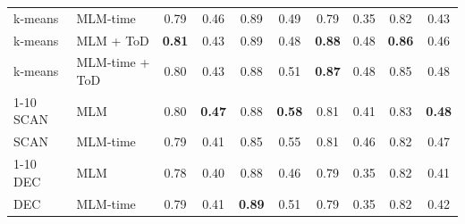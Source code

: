 \begin{table}[t]
\begin{tabular}{llcccccc|cc}
k-means & MLM-time & 0.79 & 0.46 & 0.89 & 0.49 & 0.79 & 0.35 & 0.82 & 0.43 \\
k-means & MLM + ToD & \textbf{0.81} & 0.43 & 0.89 & 0.48 & \textbf{0.88} & 0.48 & \textbf{0.86} & 0.46 \\
k-means & MLM-time + ToD & 0.80 & 0.43 & 0.88 & 0.51 & \textbf{0.87} & 0.48 & 0.85 & 0.48 \\
\cmidrule{1-10}
SCAN & MLM & 0.80 & \textbf{0.47} & 0.88 & \textbf{0.58} & 0.81 & 0.41 & 0.83 & \textbf{0.48} \\
SCAN & MLM-time & 0.79 & 0.41 & 0.85 & 0.55 & 0.81 & 0.46 & 0.82 & 0.47 \\
\cmidrule{1-10}
DEC & MLM & 0.78 & 0.40 & 0.88 & 0.46 & 0.79 & 0.35 & 0.82 & 0.41 \\
DEC & MLM-time & 0.79 & 0.41 & \textbf{0.89} & 0.51 & 0.79 & 0.35 & 0.82 & 0.42 \\
\bottomrule
\end{tabular}
\end{table}


